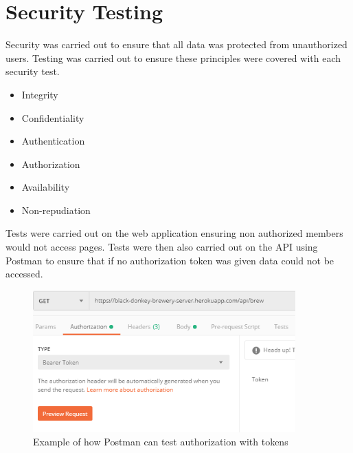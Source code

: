 \section{Security Testing}
Security was carried out to ensure that all data was protected from unauthorized users. Testing was carried out to ensure these principles were covered with each security test.
\begin{itemize}
    \item Integrity
    \item Confidentiality
    \item Authentication
    \item Authorization
    \item Availability
    \item Non-repudiation
\end{itemize}
Tests were carried out on the web application ensuring non authorized members would not access pages. Tests were then also carried out on the API using Postman to ensure that if no authorization token was given data could not be accessed. 
\begin{figure}[h!]
 	\caption{Example of how Postman can test authorization with tokens}
	\label{image:autherror}
 	\centering
 	\includegraphics[width=0.9\textwidth]{Images/TokenTest.PNG}
\end{figure}
\newpage

